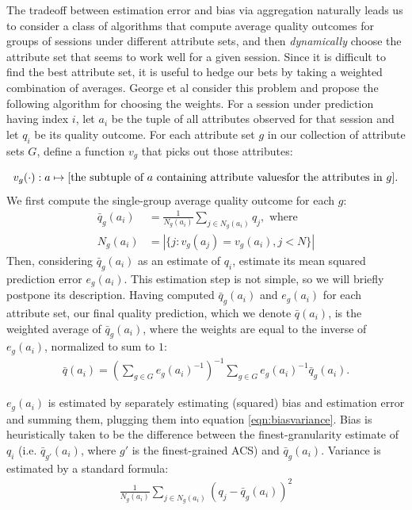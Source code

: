\label{prediction}
The tradeoff between estimation error and bias via aggregation naturally leads us to consider a class of algorithms that compute average quality outcomes for groups of sessions under different attribute sets, and then {\it dynamically} choose the attribute set that seems to work well for a given session.  Since it is difficult to find the best attribute set, it is useful to hedge our bets by taking a weighted combination of averages.  George et al \cite{george2008value} consider this problem and propose the following algorithm for choosing the weights.  For a session under prediction having index $i$, let $a_i$ be the tuple of all attributes observed for that session and let $q_i$ be its quality outcome.  For each attribute set $g$ in our collection of attribute sets $G$, define a function $v_g$ that picks out those attributes:

\begin{equation*}
  v_g(\cdot): a \mapsto \text{[the subtuple of $a$ containing attribute values} \\
  \text{for the attributes in $g$]} .
\end{equation*}
We first compute the single-group average quality outcome for each $g$:
\begin{align*}
  \bar{q}_{g}(a_i) &= \frac{1}{N_{g}(a_i)} \sum_{j \in N_{g}(a_i)} q_j, \text{ where} \\
  N_{g}(a_i) &= |\{j: v_g(a_j) = v_g(a_i), j < N\}|
\end{align*}
Then, considering $\bar{q}_{g}(a_i)$ as an estimate of $q_i$, estimate its mean squared prediction error $e_{g}(a_i)$.  This estimation step is not simple, so we will briefly postpone its description.  Having computed $\bar{q}_{g}(a_i)$ and $e_{g}(a_i)$ for each attribute set, our final quality prediction, which we denote $\bar{q}(a_i)$, is the weighted average of $\bar{q}_{g}(a_i)$, where the weights are equal to the inverse of $e_{g}(a_i)$, normalized to sum to $1$:
\begin{align*}
  \bar{q}(a_i) = (\sum_{g \in G} e_{g}(a_i)^{-1})^{-1} \sum_{g \in G} e_{g}(a_i)^{-1} \bar{q}_{g}(a_i) .
\end{align*}

$e_{g}(a_i)$ is estimated by separately estimating (squared) bias and estimation error and summing them, plugging them into equation \eqref{eqn:biasvariance}.  Bias is heuristically taken to be the difference between the finest-granularity estimate of $q_i$ (i.e. $\bar{q}_{g'}(a_i)$, where $g'$ is the finest-grained ACS) and $\bar{q}_{g}(a_i)$.  Variance is estimated by a standard formula:
\begin{align*}
  \frac{1}{N_{g}(a_i)} \sum_{j \in N_{g}(a_i)} (q_j - \bar{q}_{g}(a_i))^2
\end{align*}

